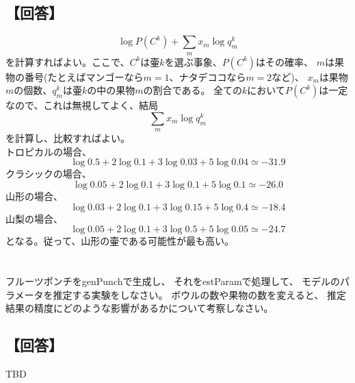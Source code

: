 \documentclass[a4j]{jarticle}
\begin{document}
\subsection{【回答】}

\begin{equation}
\log P(C^k) + \sum_{m}x_m\log q_m^k
\end{equation}
を計算すればよい。ここで、$C^k$は壷$k$を選ぶ事象、$P(C^k)$はその確率、
$m$は果物の番号(たとえばマンゴーなら$m=1$、ナタデココなら$m=2$など)、
$x_m$は果物$m$の個数、$q_m^k$は壷$k$の中の果物$m$の割合である。
全ての$k$において$P(C^k)$は一定なので、これは無視してよく、結局
\begin{equation}
\sum_{m}x_m\log q_m^k
\end{equation}
を計算し、比較すればよい。\\
トロピカルの場合、
\begin{equation}
\log 0.5 + 2\log 0.1 + 3\log 0.03 + 5\log 0.04 \simeq -31.9
\end{equation}
クラシックの場合、
\begin{equation}
\log 0.05 + 2\log 0.1 + 3\log 0.1 + 5\log 0.1 \simeq -26.0
\end{equation}
山形の場合、
\begin{equation}
\log 0.03 + 2\log 0.1 + 3\log 0.15 + 5\log 0.4 \simeq -18.4
\end{equation}
山梨の場合、
\begin{equation}
\log 0.05 + 2\log 0.1 + 3\log 0.5 + 5\log 0.05 \simeq -24.7
\end{equation}
となる。従って、山形の壷である可能性が最も高い。

\section{}
フルーツポンチをgenPunchで生成し、
それをestParamで処理して、
モデルのパラメータを推定する実験をしなさい。
ボウルの数や果物の数を変えると、
推定結果の精度にどのような影響があるかについて考察しなさい。

\subsection{【回答】}
TBD
\end{document}
